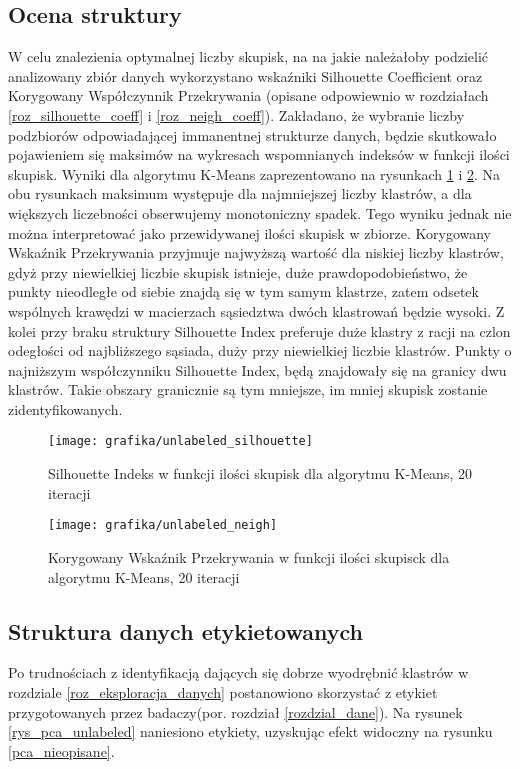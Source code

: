 \documentclass{article}
\begin{document}
\subsection{Ocena struktury}
\label{roz_ocena_strukt}
W celu znalezienia optymalnej liczby skupisk, na na jakie należałoby podzielić analizowany zbiór danych wykorzystano wskaźniki Silhouette Coefficient oraz Korygowany Współczynnik Przekrywania (opisane odpowiewnio w rozdziałach \ref{roz_silhouette_coeff} i \ref{roz_neigh_coeff}).
Zakładano, że wybranie liczby podzbiorów odpowiadającej immanentnej strukturze danych, będzie skutkowało pojawieniem się maksimów na wykresach wspomnianych indeksów w funkcji ilości skupisk.
Wyniki dla algorytmu K-Means zaprezentowano na rysunkach \ref{rysSilUnlabeled} i \ref{rysNeighUnlabeled}.
Na obu rysunkach maksimum występuje dla najmniejszej liczby klastrów, a  dla większych liczebności obserwujemy monotoniczny spadek.
Tego wyniku jednak nie można interpretować jako przewidywanej ilości skupisk w zbiorze.
Korygowany Wskaźnik Przekrywania przyjmuje najwyższą wartość dla niskiej liczby klastrów, gdyż przy niewielkiej liczbie skupisk istnieje, duże prawdopodobieństwo, że punkty nieodległe od siebie znajdą się w tym samym klastrze, zatem odsetek wspólnych krawędzi w macierzach sąsiedztwa dwóch klastrowań będzie wysoki.
Z kolei przy braku struktury Silhouette Index preferuje duże klastry z racji na czlon odegłości od najbliższego sąsiada, duży przy niewielkiej liczbie klastrów.
Punkty o najniższym współczynniku Silhouette Index, będą znajdowały się na granicy dwu klastrów.
Takie obszary granicznie są tym mniejsze, im mniej skupisk zostanie zidentyfikowanych.
\begin{figure}
\texttt{[image: grafika/unlabeled\_silhouette]}
\caption{Silhouette Indeks w funkcji ilości skupisk dla algorytmu K-Means, 20 iteracji}
\label{rysSilUnlabeled}

\end{figure}

\begin{figure}
\texttt{[image: grafika/unlabeled\_neigh]}
\caption{Korygowany Wskaźnik Przekrywania w funkcji ilości skupisck dla algorytmu K-Means, 20 iteracji}
\label{rysNeighUnlabeled}

\end{figure}
\FloatBarrier
\subsection{Struktura danych etykietowanych}
\label{rozStruktEtykiet}
Po trudnościach z identyfikacją dających się dobrze wyodrębnić klastrów w rozdziale \ref{roz_eksploracja_danych} postanowiono skorzystać z etykiet przygotowanych przez badaczy(por. rozdział \ref{rozdzial_dane}). Na rysunek \ref{rys_pca_unlabeled} naniesiono etykiety, uzyskując efekt widoczny na rysunku \ref{pca_nieopisane}.
\end{document}

